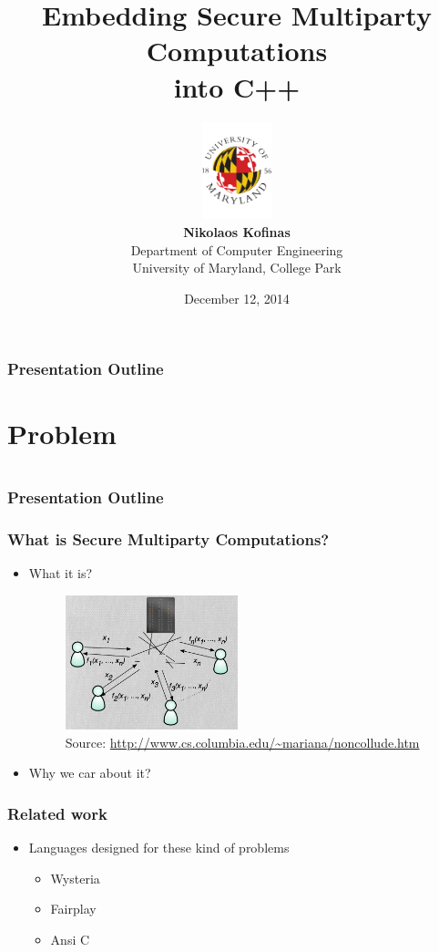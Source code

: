 \documentclass{beamer}
\title[SMC and C++]{Embedding Secure Multiparty Computations\\ into C++
}
\author[Nikolaos Kofinas]{
\includegraphics[width = 2cm]{informal.pdf}\\
\textbf{Nikolaos Kofinas}\\
Department of Computer Engineering\\
University of Maryland, College Park
\vspace*{-0.8cm}
}
\date{December 12, 2014
\vspace*{-1.2cm}
}
\begin{document}
\frame[plain]{\titlepage
}





\section[Outline]{}
\begin{frame}[fragile]
\frametitle{Presentation Outline}
\tableofcontents
\end{frame}

\section{Problem}

\section[Outline]{}
\begin{frame}[fragile]
\frametitle{Presentation Outline}
\tableofcontents[currentsection]
\end{frame}

\begin{frame}
\frametitle{What is Secure Multiparty Computations?}
\begin{itemize}
\item What it is?
\begin{figure}
\includegraphics[width=5cm]{non_collude.png}
\caption{Source:\tiny{ \url{http://www.cs.columbia.edu/~mariana/noncollude.htm}}}
\end{figure}
\item Why we car about it?
\end{itemize}
\end{frame}


\begin{frame}
\frametitle{Related work}
\begin{itemize}
\item Languages designed for these kind of problems
\begin{itemize}
\item Wysteria
\item Fairplay
\item Ansi C
\end{itemize}
\end{itemize}
\end{frame}
\end{document}
